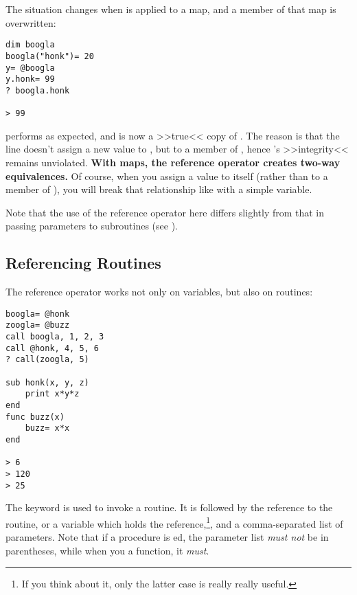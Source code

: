 The situation changes when \Co{\at} is applied to a map, and a member of
that map is overwritten:

\begin{lstlisting}
dim boogla
boogla("honk")= 20
y= @boogla
y.honk= 99
? boogla.honk

> 99
\end{lstlisting}

performs as expected, and  is now a >>true<< copy of .
The reason is that the line  doesn't assign a new value
to , but to a member of , hence 's >>integrity<<
remains unviolated. \textbf{With maps, the reference operator creates
two-way equivalences.} Of course, when you assign a value to 
itself (rather than to a member of ), you will break that
relationship like with a simple variable.

Note that the use of the reference operator here differs slightly from
that in passing parameters to subroutines (see
).

\subsection{Referencing Routines}

The reference operator \Co{\at} works not only on variables, but also
on routines:

\begin{lstlisting}
boogla= @honk
zoogla= @buzz
call boogla, 1, 2, 3
call @honk, 4, 5, 6
? call(zoogla, 5)

sub honk(x, y, z)
	print x*y*z
end
func buzz(x)
	buzz= x*x
end

> 6
> 120
> 25
\end{lstlisting}

The keyword  is used to invoke a routine. It is followed by the
reference to the routine, or a variable which holds the
reference,\footnote{If you think about it, only the latter case
is really really useful.}, and a comma-separated list of parameters.
Note that if a procedure is ed, the parameter list \emph{must
not} be in parentheses, while when you  a function, it
\emph{must}.
